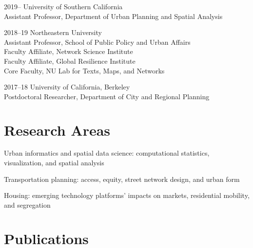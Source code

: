 \documentclass[12pt,letterpaper]{report}
\newcommand{\listitemspace}{0.25em}
\renewenvironment{itemize}
{\begin{list}{}{\setlength{\leftmargin}{0em}
            \setlength{\parskip}{0em}
            \setlength{\itemsep}{\listitemspace}
            \setlength{\parsep}{\listitemspace}}}
{\end{list}}
\begin{document}
    \begin{tablist}

        \item[2019--]   \tab University of Southern California \\
                             Assistant Professor, Department of Urban Planning and Spatial Analysis

        \item[2018--19] \tab Northeastern University \\
                             Assistant Professor, School of Public Policy and Urban Affairs \\
                             Faculty Affiliate, Network Science Institute \\
                             Faculty Affiliate, Global Resilience Institute \\
                             Core Faculty, NU Lab for Texts, Maps, and Networks

        \item[2017--18] \tab University of California, Berkeley \\
                             Postdoctoral Researcher, Department of City and Regional Planning

    \end{tablist}



    \section*{Research Areas}

    \begin{itemize}

        \item Urban informatics and spatial data science: computational statistics, visualization, and spatial analysis

        \item Transportation planning: access, equity, street network design, and urban form

        \item Housing: emerging technology platforms' impacts on markets, residential mobility, and segregation

    \end{itemize}



    \section*{Publications}
\end{document}
